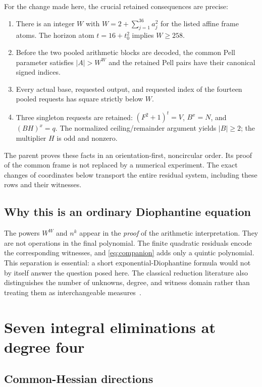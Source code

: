 \documentclass[11pt,letterpaper]{article}
\theoremstyle{definition}\newtheorem{definition}[theorem]{Definition}
\theoremstyle{remark}\newtheorem{remark}[theorem]{Remark}
\begin{document}
For the change made here, the crucial retained consequences are precise:
\begin{enumerate}[label=(\roman*)]
\item There is an integer $W$ with
 $W=2+\sum_{j=1}^{36}a_j^2$ for the listed affine frame atoms. The
 horizon atom $t=16+t_0^2$ implies $W\ge258$.
\item Before the two pooled arithmetic blocks are decoded, the common
 Pell parameter satisfies $|A|>W^W$ and the retained Pell pairs have
 their canonical signed indices.
\item Every actual base, requested output, and requested index of the
 fourteen pooled requests has square strictly below $W$.
\item Three singleton requests are retained: $(F^2+1)^t=V$, $B^x=N$,
 and $(BH)^x=q$. The normalized ceiling/remainder argument yields
 $|B|\ge2$; the multiplier $H$ is odd and nonzero.
\end{enumerate}
The parent proves these facts in an orientation-first, noncircular
order. Its proof of the common frame is not replaced by a numerical
experiment. The exact changes of coordinates below transport the entire
residual system, including these rows and their witnesses.

\subsection{Why this is an ordinary Diophantine equation}

The powers $W^W$ and $n^k$ appear in the \emph{proof} of the arithmetic
interpretation. They are not operations in the final polynomial. The
finite quadratic residuals encode the corresponding witnesses, and
\eqref{eq:companion} adds only a quintic polynomial. This separation is
essential: a short exponential-Diophantine formula would not by itself
answer the question posed here. The classical reduction literature also
distinguishes the number of unknowns, degree, and witness domain rather
than treating them as interchangeable measures~\cite{mr75,bayer2025}.

\section{Seven integral eliminations at degree four}

\subsection{Common-Hessian directions}
\end{document}
